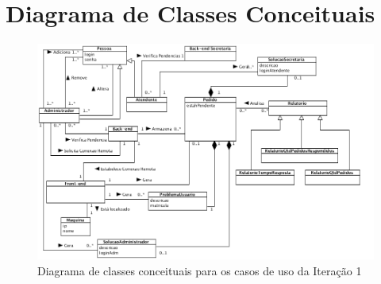 \documentclass[brazil,times]{abnt}
\begin{document}
\section{Diagrama de Classes Conceituais}
\begin{figure}[htp]
\begin{center}
  \includegraphics[width=\linewidth]{diagramas/diagramaConceitual.png}
  \caption[Diagrama de classes conceituais para os casos de uso
  da Iteração 1]{Diagrama de classes conceituais para os casos de uso
  da Iteração 1}
  \label{diagrama-conceitual}
\end{center}
\end{figure}
\end{document}
